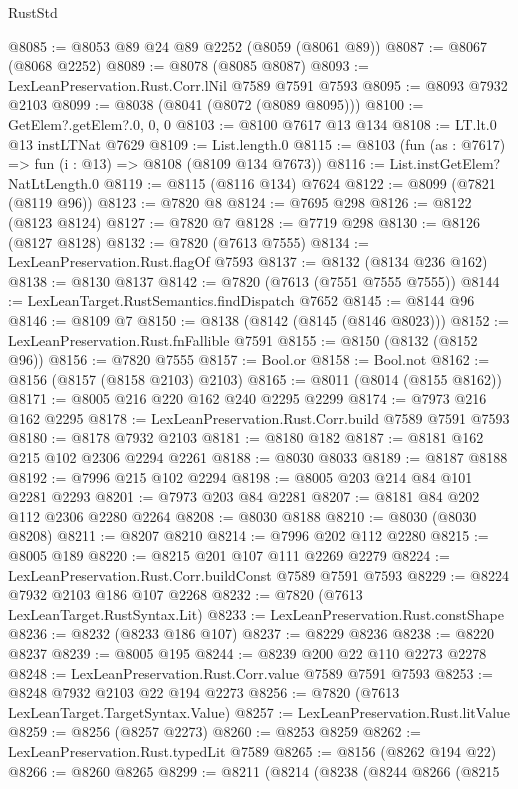 \begin{lexlean}{RustStd}
\begin{coremodule}
@8085 := @8053 @89 @24 @89 @2252 (@8059 (@8061 @89))
@8087 := @8067 (@8068 @2252)
@8089 := @8078 (@8085 @8087)
@8093 := LexLeanPreservation.Rust.Corr.lNil @7589 @7591 @7593
@8095 := @8093 @7932 @2103
@8099 := @8038 (@8041 (@8072 (@8089 @8095)))
@8100 := GetElem?.getElem?.{0, 0, 0}
@8103 := @8100 @7617 @13 @134
@8108 := LT.lt.{0} @13 instLTNat @7629
@8109 := List.length.{0}
@8115 := @8103 (fun (as : @7617) => fun (i : @13) => @8108 (@8109 @134 @7673))
@8116 := List.instGetElem?NatLtLength.{0}
@8119 := @8115 (@8116 @134) @7624
@8122 := @8099 (@7821 (@8119 @96))
@8123 := @7820 @8
@8124 := @7695 @298
@8126 := @8122 (@8123 @8124)
@8127 := @7820 @7
@8128 := @7719 @298
@8130 := @8126 (@8127 @8128)
@8132 := @7820 (@7613 @7555)
@8134 := LexLeanPreservation.Rust.flagOf @7593
@8137 := @8132 (@8134 @236 @162)
@8138 := @8130 @8137
@8142 := @7820 (@7613 (@7551 @7555 @7555))
@8144 := LexLeanTarget.RustSemantics.findDispatch @7652
@8145 := @8144 @96
@8146 := @8109 @7
@8150 := @8138 (@8142 (@8145 (@8146 @8023)))
@8152 := LexLeanPreservation.Rust.fnFallible @7591
@8155 := @8150 (@8132 (@8152 @96))
@8156 := @7820 @7555
@8157 := Bool.or
@8158 := Bool.not
@8162 := @8156 (@8157 (@8158 @2103) @2103)
@8165 := @8011 (@8014 (@8155 @8162))
@8171 := @8005 @216 @220 @162 @240 @2295 @2299
@8174 := @7973 @216 @162 @2295
@8178 := LexLeanPreservation.Rust.Corr.build @7589 @7591 @7593
@8180 := @8178 @7932 @2103
@8181 := @8180 @182
@8187 := @8181 @162 @215 @102 @2306 @2294 @2261
@8188 := @8030 @8033
@8189 := @8187 @8188
@8192 := @7996 @215 @102 @2294
@8198 := @8005 @203 @214 @84 @101 @2281 @2293
@8201 := @7973 @203 @84 @2281
@8207 := @8181 @84 @202 @112 @2306 @2280 @2264
@8208 := @8030 @8188
@8210 := @8030 (@8030 @8208)
@8211 := @8207 @8210
@8214 := @7996 @202 @112 @2280
@8215 := @8005 @189
@8220 := @8215 @201 @107 @111 @2269 @2279
@8224 := LexLeanPreservation.Rust.Corr.buildConst @7589 @7591 @7593
@8229 := @8224 @7932 @2103 @186 @107 @2268
@8232 := @7820 (@7613 LexLeanTarget.RustSyntax.Lit)
@8233 := LexLeanPreservation.Rust.constShape
@8236 := @8232 (@8233 @186 @107)
@8237 := @8229 @8236
@8238 := @8220 @8237
@8239 := @8005 @195
@8244 := @8239 @200 @22 @110 @2273 @2278
@8248 := LexLeanPreservation.Rust.Corr.value @7589 @7591 @7593
@8253 := @8248 @7932 @2103 @22 @194 @2273
@8256 := @7820 (@7613 LexLeanTarget.TargetSyntax.Value)
@8257 := LexLeanPreservation.Rust.litValue
@8259 := @8256 (@8257 @2273)
@8260 := @8253 @8259
@8262 := LexLeanPreservation.Rust.typedLit @7589
@8265 := @8156 (@8262 @194 @22)
@8266 := @8260 @8265
@8299 := @8211
    (@8214
      (@8238
        (@8244
          @8266
          (@8215

\end{coremodule}
\end{lexlean}
